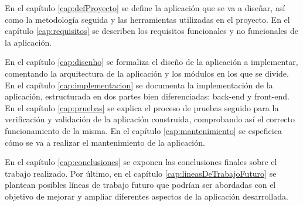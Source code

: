 En el capítulo \ref{cap:defProyecto} se define la aplicación que se va a diseñar, así como la metodología seguida y las herramientas utilizadas en el proyecto.
En el capítulo \ref{cap:requisitos} se describen los requisitos funcionales y no funcionales de la aplicación.

En el capítulo \ref{cap:disenho} se formaliza el diseño de la aplicación a implementar, comentando la arquitectura de la aplicación y los módulos en los que se divide.
En el capítulo \ref{cap:implementacion} se documenta la implementación de la aplicación, estructurada en dos partes bien diferenciadas: \gls{back-end} y \gls{front-end}.
En el capítulo \ref{cap:pruebas} se explica el proceso de pruebas seguido para la verificación y validación de la aplicación construida, comprobando así el correcto funcionamiento de la misma.
En el capítulo \ref{cap:mantenimiento} se espeficica cómo se va a realizar el mantenimiento de la aplicación.

En el capítulo \ref{cap:conclusiones} se exponen las conclusiones finales sobre el trabajo realizado. Por último, en el capítulo \ref{cap:lineasDeTrabajoFuturo} se plantean posibles líneas de trabajo futuro que podrían ser abordadas con el objetivo de mejorar y ampliar diferentes aspectos de la aplicación desarrollada.